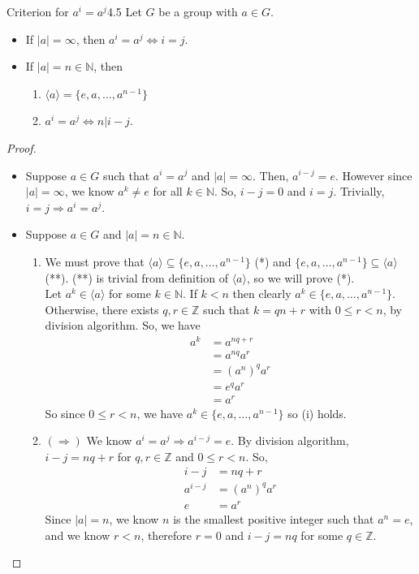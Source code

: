 \documentclass[12pt]{article}
\newcommand{\N}{\mathbb{N}}
\newcommand{\Z}{\mathbb{Z}}
\begin{document}
	\begin{mythm}{Criterion for $a^i=a^j$}{4.5}
		Let $G$ be a group with $a\in G$.
		\begin{itemize}
			\item If $|a|=\infty$, then $a^i=a^j\Longleftrightarrow i=j$.
			\item If $|a|=n\in\N$, then
			\begin{enumerate}[label=(\roman*)]
				\item $\langle a\rangle=\{e, a, \dots, a^{n-1}\}$
				\item $a^i=a^j\Longleftrightarrow n|i-j$.
			\end{enumerate}
		\end{itemize}
		
		\begin{proof}~\\
			\begin{itemize}
				\item Suppose $a\in G$ such that $a^i=a^j$ and $|a|=\infty$. Then, $a^{i-j}=e$. However since $|a|=\infty$, we know $a^k\neq e$ for all $k\in\N$. So, $i-j=0$ and $i=j$. Trivially, $i=j\Longrightarrow a^i=a^j$.
				\item Suppose $a\in G$ and $|a|=n\in\N$.
				\begin{enumerate}[label=(\roman*)]
					\item We must prove that $\langle a\rangle\subseteq\{e, a, \dots, a^{n-1}\}$ (*) and $\{e, a, \dots, a^{n-1}\}\subseteq\langle a\rangle$ (**). (**) is trivial from definition of $\langle a\rangle$, so we will prove (*).\\
					
					Let $a^k\in\langle a\rangle$ for some $k\in\N$. If $k<n$ then clearly $a^k\in\{e, a, \dots, a^{n-1}\}$. Otherwise, there exists $q, r\in\Z$ such that $k=qn+r$ with $0\leq r<n$, by division algorithm. So, we have
					\begin{align*}
						a^k&=a^{nq+r}\\
						&=a^{nq}a^r\\
						&=(a^n)^qa^r\\
						&=e^qa^r\\
						&=a^r
					\end{align*}
					So since $0\leq r<n$, we have $a^k\in\{e, a, \dots, a^{n-1}\}$ so (i) holds.
					
					\item $(\Longrightarrow)$ We know $a^i=a^j\Longrightarrow a^{i-j}=e$. By division algorithm, $i-j=nq+r$ for $q, r\in\Z$ and $0\leq r<n$. So,
					\begin{align*}
						i-j&=nq+r\\
						a^{i-j}&=(a^n)^qa^r\\
						e&=a^r
					\end{align*}
					Since $|a|=n$, we know $n$ is the smallest positive integer such that $a^n=e$, and we know $r<n$, therefore $r=0$ and $i-j=nq$ for some $q\in\Z$.
					

\end{enumerate}
\end{itemize}
\end{proof}
\end{mythm}
\end{document}
